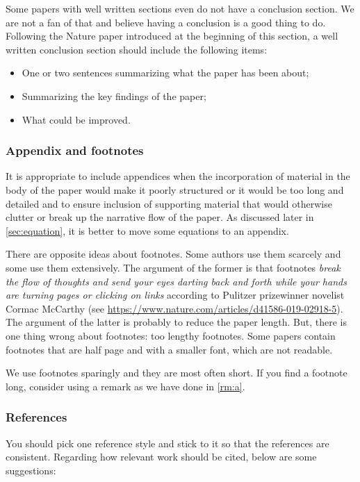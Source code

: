 \documentclass[authoryear,3p,times,preprint,review,fleqn]{elsarticle}
\numberwithin{equation}{section}
\theoremstyle{remark}
\begin{document}
Some papers with well written sections even do not have a conclusion section. We are not a fan of that and believe having a conclusion is a good thing to do. Following the Nature paper introduced at the beginning of this section, a well written conclusion section should include the following items:

\begin{itemize}
\item One or two sentences summarizing what the paper has been about;
\item Summarizing the key findings of the paper;
\item What could be improved.
\end{itemize}

\subsubsection{Appendix and footnotes}\label{sec:appendix-footnotes}

It is appropriate to include appendices when
the incorporation of material in the body of the paper would make it poorly structured or it would be too long and detailed and to ensure inclusion of supporting material that would otherwise clutter or break up the narrative flow of the paper.
As discussed later in \cref{sec:equation}, it is better to move some equations to an appendix.

There are opposite ideas about footnotes. Some authors use them scarcely and some use them extensively. The argument of the former is that footnotes \textit{break the flow of thoughts and send your eyes darting back and forth while your hands are turning pages or clicking on links} according to Pulitzer prizewinner novelist Cormac McCarthy (see \url{https://www.nature.com/articles/d41586-019-02918-5}). The argument of the latter is probably to reduce the paper length. But, there is one thing wrong about footnotes: too lengthy footnotes. Some papers contain footnotes that are half page and with a smaller font, which are not readable.

We use footnotes sparingly and they are most often short. If you find a footnote long, consider using a remark as we have done in \cref{rm:a}.

\subsubsection{References}\label{sec:references}

You should pick one reference style and stick to it so that the references are consistent. Regarding how relevant work should be cited, below are some suggestions:
\end{document}
